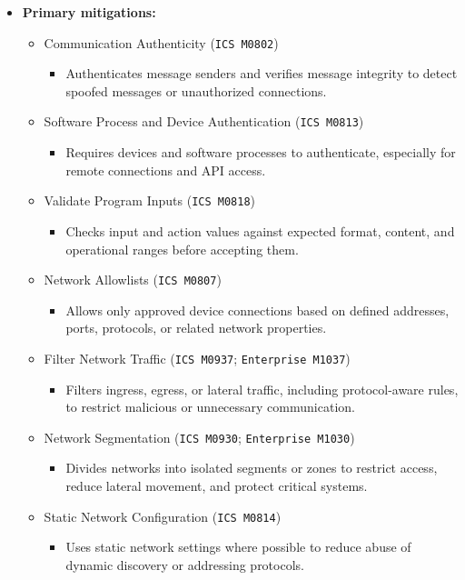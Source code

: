 \documentclass[10pt,a4paper,oneside]{report}
\begin{document}
\begin{itemize}
\item \textbf{Primary mitigations:}
\begin{itemize}
\item Communication Authenticity (\texttt{ICS M0802})
\begin{itemize}
\item Authenticates message senders and verifies message integrity to detect spoofed messages or unauthorized connections.
\end{itemize}
\item Software Process and Device Authentication (\texttt{ICS M0813})
\begin{itemize}
\item Requires devices and software processes to authenticate, especially for remote connections and API access.
\end{itemize}
\item Validate Program Inputs (\texttt{ICS M0818})
\begin{itemize}
\item Checks input and action values against expected format, content, and operational ranges before accepting them.
\end{itemize}
\item Network Allowlists (\texttt{ICS M0807})
\begin{itemize}
\item Allows only approved device connections based on defined addresses, ports, protocols, or related network properties.
\end{itemize}
\item Filter Network Traffic (\texttt{ICS M0937}; \texttt{Enterprise M1037})
\begin{itemize}
\item Filters ingress, egress, or lateral traffic, including protocol-aware rules, to restrict malicious or unnecessary communication.
\end{itemize}
\item Network Segmentation (\texttt{ICS M0930}; \texttt{Enterprise M1030})
\begin{itemize}
\item Divides networks into isolated segments or zones to restrict access, reduce lateral movement, and protect critical systems.
\end{itemize}
\item Static Network Configuration (\texttt{ICS M0814})
\begin{itemize}
\item Uses static network settings where possible to reduce abuse of dynamic discovery or addressing protocols.
\end{itemize}
\end{itemize}
\end{itemize}
\end{document}
